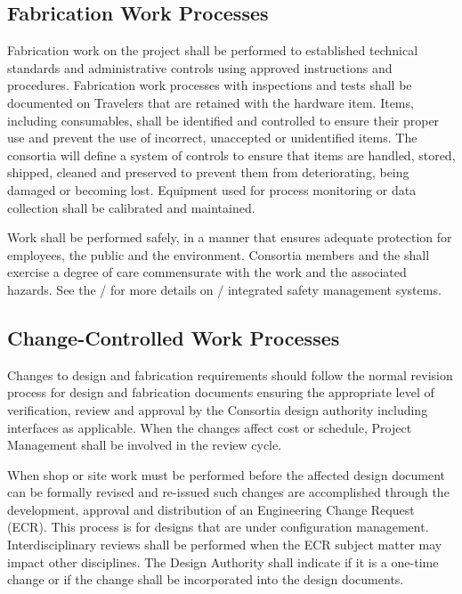 \subsection{Fabrication Work Processes}

Fabrication work on the  project shall be performed to
established technical standards and administrative controls using
approved instructions and procedures. Fabrication work processes with
 inspections and tests shall be documented on Travelers that
are retained with the hardware item. Items, including consumables,
shall be identified and controlled to ensure their proper use and
prevent the use of incorrect, unaccepted or unidentified items. The
consortia will define a system of controls to ensure that items are
handled, stored, shipped, cleaned and preserved to prevent them from
deteriorating, being damaged or becoming lost. Equipment used for
process monitoring or data collection shall be calibrated and
maintained.

Work shall be performed safely, in a manner that ensures adequate
protection for employees, the public and the environment. Consortia
members and the   shall exercise a degree of
care commensurate with the work and the associated hazards. See the
/  for more details on
/ integrated safety management systems.

\subsection{Change-Controlled Work Processes}

Changes to design and fabrication requirements should follow the normal 
revision process for design and fabrication documents ensuring the 
appropriate level of verification, review and approval by the Consortia 
design authority including interfaces as applicable. When the changes 
affect cost or schedule, Project Management shall be involved in the 
review cycle. 

When shop or site work must be performed before the affected design 
document can be formally revised and re-issued such changes are 
accomplished through the development, approval and distribution of an 
Engineering Change Request (ECR). This process is for designs that are 
under configuration management. Interdisciplinary reviews shall be 
performed when the ECR subject matter may impact other disciplines. The 
Design Authority shall indicate if it is a one-time change or if the 
change shall be incorporated into the design documents.

